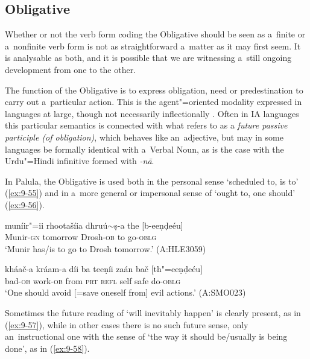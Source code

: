 \subsection{Obligative}
\label{subsec:9-2-3}

Whether or not the verb form coding the Obligative should be seen as a~finite or a~nonfinite verb form is not as straightforward a~matter as it may first seem. It is analysable as both, and it is possible that we are witnessing a~still ongoing development from one to the other. 



The function of the Obligative is to express obligation, need or predestination to carry out a~particular action. This is the agent"=oriented modality expressed in languages at large, though not necessarily inflectionally \citep[177--187]{bybeeetal1994}. Often in IA languages this particular semantics is connected with what \citet[322]{masica1991} refers to as a \textit{future passive participle (of obligation)}, which behaves like an~adjective, but may in some languages be formally identical with a~Verbal Noun, as is the case with the Urdu"=Hindi infinitive formed with \textit{-nā}. 



In Palula, the Obligative is used both in the personal sense `scheduled to, is to' (\ref{ex:9-55}) and in a~more general or impersonal sense of `ought to, one should' (\ref{ex:9-56}).

\begin{exe}
\ex
\label{ex:9-55}
\gll muníir"=ii rhootašíia dhruú$\sim$ṣ-a the [b-eeṇḍeéu] \\
Munir-\textsc{gn } tomorrow Drosh-\textsc{ob} to go-\textsc{oblg} \\
\glt `Munir has/is to go to Drosh tomorrow.' (A:HLE3059)

\ex
\label{ex:9-56}
\gll kháač-a kráam-a díi ba teeṇíi zaán bač [th"=eeṇḍeéu] \\
bad-\textsc{ob} work-\textsc{ob} from \textsc{prt} \textsc{refl} self safe do-\textsc{oblg} \\
\glt `One should avoid [=save oneself from] evil actions.' (A:SMO023)
\end{exe}

Sometimes the future reading of `will inevitably happen' is clearly present, as in (\ref{ex:9-57}), while in other cases there is no such future sense, only an~instructional one with the sense of `the way it should be/usually is being done', as in (\ref{ex:9-58}).

